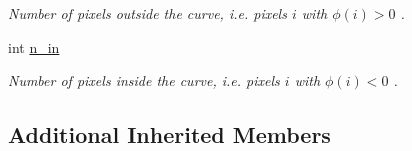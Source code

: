 \begin{DoxyCompactItemize}
\begin{DoxyCompactList}\small\item\em Number of pixels outside the curve, i.\-e. pixels $i$ with $\phi \left( i\right) >0$ . \end{DoxyCompactList}\item 
\hypertarget{classofeli_1_1_a_cwithout_edges_y_u_v_a63542bb13e9dd879714b6c71cd5fe62c}{int \hyperlink{classofeli_1_1_a_cwithout_edges_y_u_v_a63542bb13e9dd879714b6c71cd5fe62c}{n\-\_\-in}}\label{classofeli_1_1_a_cwithout_edges_y_u_v_a63542bb13e9dd879714b6c71cd5fe62c}

\begin{DoxyCompactList}\small\item\em Number of pixels inside the curve, i.\-e. pixels $i$ with $\phi \left( i\right) <0$ . \end{DoxyCompactList}\end{DoxyCompactItemize}
\subsection*{Additional Inherited Members}


